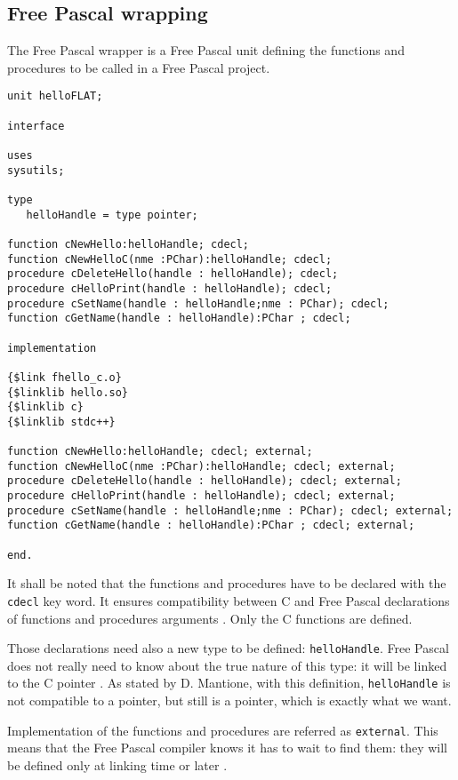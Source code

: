 \documentclass[A4paper]{article}
\begin{document}
\subsection{Free Pascal wrapping}

The Free Pascal wrapper is a Free Pascal unit defining the functions and
procedures to be called in a Free Pascal project.

\begin{verbatim}
unit helloFLAT;

interface

uses
sysutils;

type
   helloHandle = type pointer;

function cNewHello:helloHandle; cdecl;
function cNewHelloC(nme :PChar):helloHandle; cdecl;
procedure cDeleteHello(handle : helloHandle); cdecl;
procedure cHelloPrint(handle : helloHandle); cdecl;
procedure cSetName(handle : helloHandle;nme : PChar); cdecl;
function cGetName(handle : helloHandle):PChar ; cdecl;

implementation

{$link fhello_c.o}
{$linklib hello.so}
{$linklib c}
{$linklib stdc++}

function cNewHello:helloHandle; cdecl; external;
function cNewHelloC(nme :PChar):helloHandle; cdecl; external;
procedure cDeleteHello(handle : helloHandle); cdecl; external;
procedure cHelloPrint(handle : helloHandle); cdecl; external;
procedure cSetName(handle : helloHandle;nme : PChar); cdecl; external;
function cGetName(handle : helloHandle):PChar ; cdecl; external;

end.

\end{verbatim}

It shall be noted that the functions and procedures have to be declared with
the \verb|cdecl| key word. It ensures compatibility between C and Free Pascal
declarations of functions and procedures arguments \cite{FPDoc,FPFor}. Only
the C functions are defined.

Those declarations need also a new type to be defined:
\verb|helloHandle|. Free Pascal does not really need to know about the true
nature of this type: it will be linked to the C pointer \cite{Rudy2006}. As
stated by D. Mantione, with this definition, \verb|helloHandle| is not
compatible to a pointer, but still is a pointer, which is exactly what we want.

Implementation of the functions and procedures are referred as
\verb|external|. This means that the Free Pascal compiler knows it has to wait
to find them: they will be defined only at linking time or later
\cite{FPDoc,FPFor}.
\end{document}
